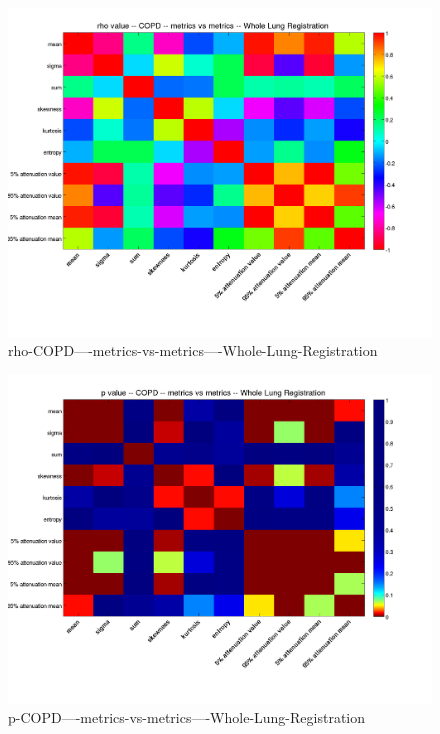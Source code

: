 \documentclass[12pt]{article}
\begin{document}
\begin{figure}
    \includegraphics[width=0.84\linewidth,viewport=100 60 620 550]{corr/rho-COPD----metrics-vs-metrics----Whole-Lung-Registration.png}
    \caption{rho-COPD----metrics-vs-metrics----Whole-Lung-Registration}
    \label{fig:rho-COPD----metrics-vs-metrics----Whole-Lung-Registration}
\end{figure}
\begin{figure}
    \includegraphics[width=0.84\linewidth,viewport=100 60 620 550]{corr/p-COPD----metrics-vs-metrics----Whole-Lung-Registration.png}
    \caption{p-COPD----metrics-vs-metrics----Whole-Lung-Registration}
    \label{fig:p-COPD----metrics-vs-metrics----Whole-Lung-Registration}
\end{figure}
\end{document}
